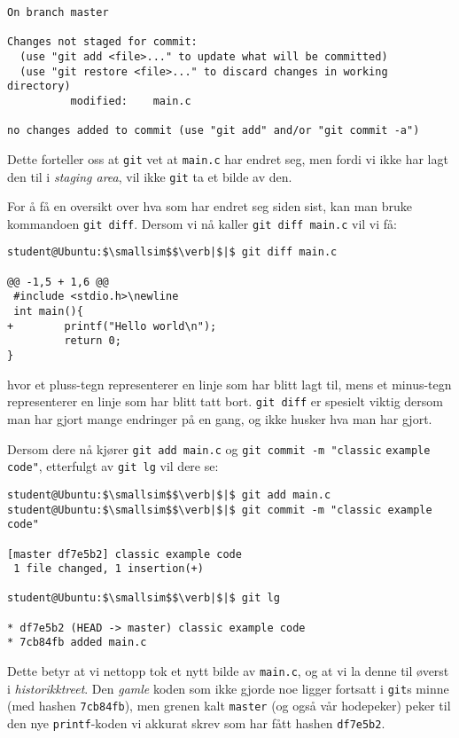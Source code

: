 \begin{alphasection}
\begin{lstlisting}[mathescape=true]
On branch master

Changes not staged for commit:
  (use "git add <file>..." to update what will be committed)
  (use "git restore <file>..." to discard changes in working directory)
	      modified:    main.c

no changes added to commit (use "git add" and/or "git commit -a")
\end{lstlisting}


Dette forteller oss at \verb|git| vet at \verb|main.c| har endret seg, men fordi vi ikke har lagt den til i \textit{staging area}, vil ikke \verb|git| ta et bilde av den.

For å få en oversikt over hva som har endret seg siden sist, kan man bruke kommandoen \verb|git diff|. Dersom vi nå kaller \verb|git diff main.c| vil vi få:

\begin{lstlisting}[mathescape=true]
student@Ubuntu:$\smallsim$$\verb|$|$ git diff main.c

@@ -1,5 + 1,6 @@
 #include <stdio.h>\newline
 int main(){
+        printf("Hello world\n");
         return 0;
}
\end{lstlisting}



hvor et pluss-tegn representerer en linje som har blitt lagt til, mens et minus-tegn representerer en linje som har blitt tatt bort. \verb|git diff| er spesielt viktig dersom man har gjort mange endringer på en gang, og ikke husker hva man har gjort.

Dersom dere nå kjører \verb|git add main.c| og \verb|git commit -m "classic|  \verb|example code"|, etterfulgt av \verb|git lg| vil dere se:

\begin{lstlisting}[mathescape=true]
student@Ubuntu:$\smallsim$$\verb|$|$ git add main.c
student@Ubuntu:$\smallsim$$\verb|$|$ git commit -m "classic example code"

[master df7e5b2] classic example code
 1 file changed, 1 insertion(+)

student@Ubuntu:$\smallsim$$\verb|$|$ git lg

* df7e5b2 (HEAD -> master) classic example code
* 7cb84fb added main.c
\end{lstlisting}


Dette betyr at vi nettopp tok et nytt bilde av \verb|main.c|, og at vi la denne
til øverst i \textit{historikktreet}. Den \textit{gamle} koden som ikke gjorde noe ligger
fortsatt i \verb|git|s minne (med hashen \verb|7cb84fb|), men grenen kalt \verb|master| (og også vår hodepeker)
peker til den nye \verb|printf|-koden vi akkurat skrev som har fått hashen \verb|df7e5b2|.


\end{alphasection}
